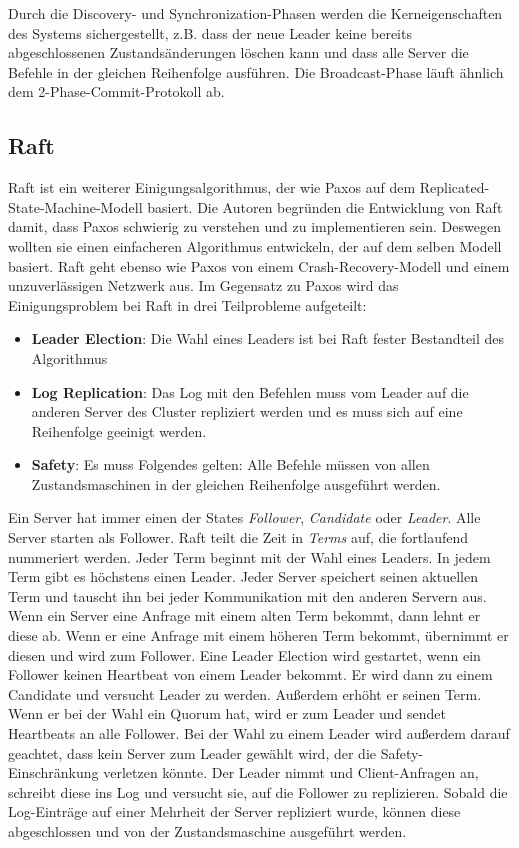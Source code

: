 Durch die Discovery- und Synchronization-Phasen werden die Kerneigenschaften des Systems sichergestellt, z.B. dass der neue Leader keine bereits abgeschlossenen Zustandsänderungen löschen kann und dass alle Server die Befehle in der gleichen Reihenfolge ausführen. Die Broadcast-Phase läuft ähnlich dem 2-Phase-Commit-Protokoll \cite{2pc} ab.

\subsection{Raft}


Raft \cite{raft, raft-thesis} ist ein weiterer Einigungsalgorithmus, der wie Paxos auf dem Replicated-State-Machine-Modell basiert. Die Autoren begründen die Entwicklung von Raft damit, dass Paxos schwierig zu verstehen und zu implementieren sein. Deswegen wollten sie einen einfacheren Algorithmus entwickeln, der auf dem selben Modell basiert. Raft geht ebenso wie Paxos von einem Crash-Recovery-Modell und einem unzuverlässigen Netzwerk aus.
Im Gegensatz zu Paxos wird das Einigungsproblem bei Raft in drei Teilprobleme aufgeteilt:
\begin{itemize}
	\item \textbf{Leader Election}: Die Wahl eines Leaders ist bei Raft fester Bestandteil des Algorithmus 
	\item \textbf{Log Replication}: Das Log mit den Befehlen muss vom Leader auf die anderen Server des Cluster repliziert werden und es muss sich auf eine Reihenfolge geeinigt werden.
	\item \textbf{Safety}: Es muss Folgendes gelten: Alle Befehle müssen von allen Zustandsmaschinen in der gleichen Reihenfolge ausgeführt werden.
\end{itemize}

Ein Server hat immer einen der States \textit{Follower}, \textit{Candidate} oder \textit{Leader}. Alle Server starten als Follower. Raft teilt die Zeit in \textit{Terms} auf, die fortlaufend nummeriert werden. Jeder Term beginnt mit der Wahl eines Leaders. In jedem Term gibt es höchstens einen Leader. Jeder Server speichert seinen aktuellen Term und tauscht ihn bei jeder Kommunikation mit den anderen Servern aus. Wenn ein Server eine Anfrage mit einem alten Term bekommt, dann lehnt er diese ab. Wenn er eine Anfrage mit einem höheren Term bekommt, übernimmt er diesen und wird zum Follower. Eine Leader Election wird gestartet, wenn ein Follower keinen Heartbeat von einem Leader bekommt. Er wird dann zu einem Candidate und versucht Leader zu werden. Außerdem erhöht er seinen Term. Wenn er bei der Wahl ein Quorum hat, wird er zum Leader und sendet Heartbeats an alle Follower. Bei der Wahl zu einem Leader wird außerdem darauf geachtet, dass kein Server zum Leader gewählt wird, der die Safety-Einschränkung verletzen könnte. Der Leader nimmt und Client-Anfragen an, schreibt diese ins Log und versucht sie, auf die Follower zu replizieren. Sobald die Log-Einträge auf einer Mehrheit der Server repliziert wurde, können diese abgeschlossen und von der Zustandsmaschine ausgeführt werden.

